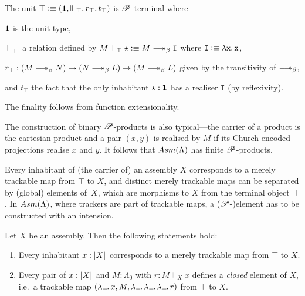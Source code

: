 \documentclass[a4paper,UKenglish,numberwithinsect,cleveref,thm-restate,draft]{lipics-v2021}
\numberwithin{equation}{section}
\theoremstyle{definition}
\theoremstyle{plain}
\begin{document}
\begin{example}
  The unit $\top \vcentcolon\equiv (\mathbf{1}, \Vdash_\top, r_\top, t_\top)$ is $\mathscr{P}$-terminal where 
  \begin{romanenumerate}
    \item $\mathbf{1}$ is the unit type,  
    \item $\Vdash_\top$ a relation defined by $M \Vdash_\top \star \defeq M \reduce \mathtt{I}$ where $\mathtt{I} \vcentcolon\equiv \mathtt{\lambda x.\, x}$, 
    \item $r_\top : (M \reduce N) \to (N \reduce L) \to (M \reduce L)$ given by the transitivity of $\reduce$,
    \item and $t_\top$ the fact that the only inhabitant $\star : \mathbf{1}$ has a realiser $\mathtt{I}$ (by reflexivity).
  \end{romanenumerate}
  The finality follows from function extensionality.
\end{example}
The construction of binary $\mathscr{P}$-products is also typical---the carrier of a product is the cartesian product and a pair $(x, y)$ is realised by $M$ if its Church-encoded projections realise $x$ and $y$.
It follows that $\Asm(\Lambda)$ has finite $\mathscr{P}$-products.

Every inhabitant of (the carrier of) an assembly $X$ corresponds to a merely trackable map from $\top$ to $X$, and distinct merely trackable maps can be separated by (global) elements of~$X$, which are morphisms to $X$ from the terminal object~$\top$.
In $\Asm(\Lambda)$, where trackers are part of trackable maps, a ($\mathscr{P}$-)element has to be constructed with an intension.
\begin{lemma}\label{lem:global-element}
  Let $X$ be an assembly. Then the following statements hold:
  \begin{enumerate}
    \item Every inhabitant $x : \mathopen{}\left|X\right|_{}^{}\mathclose{}$ corresponds to a merely trackable map from $\top$ to $X$.
    \item Every pair of $x : \mathopen{}\left|X\right|_{}^{}\mathclose{}$ and $M : \Lambda_0$ with $r : M \Vdash_X x$ defines a \emph{closed} element of $X$, i.e.\ a trackable map $(\lambda\anonymous.\, x, M, \lambda\anonymous.\,\lambda\anonymous.\, \lambda\anonymous.\, r)$ from $\top$ to $X$.
  \end{enumerate}
\end{lemma}
\end{document}
